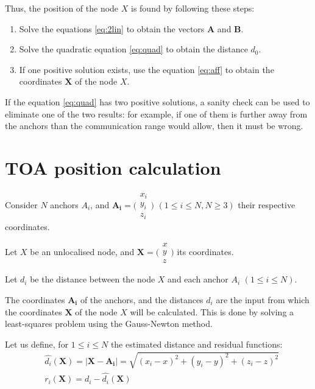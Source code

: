 \documentclass[12pt,a4paper,fleqn]{report}
\begin{document}
\begin{appendices}
{Thus, the position of the node $X$ is found by following these steps:
\begin{enumerate}
	\item Solve the equations \eqref{eq:2lin} to obtain the vectors $\mathbf{A}$ and $\mathbf{B}$.
	\item Solve the quadratic equation \eqref{eq:quad} to obtain the distance $d_0$.
	\item If one positive solution exists, use the equation \eqref{eq:aff} to obtain the coordinates $\mathbf{X}$ of the node $X$.
\end{enumerate}
If the equation \eqref{eq:quad} has two positive solutions, a sanity check can be used to eliminate one of the two results: for example, if one of them is further away from the anchors than the communication range would allow, then it must be wrong.

}

\chapter{TOA position calculation}
\label{appendix:toa}

{\parindent0pt %

Consider $N$ anchors $A_i$, and $\mathbf{A_i} = \bigl( \begin{smallmatrix} x_i \\ y_i \\ z_i \end{smallmatrix} \bigr)$ $(1 \leq i \leq N, N \geq 3)$ their respective coordinates.

Let $X$ be an unlocalised node, and $\mathbf{X} = \bigl( \begin{smallmatrix} x \\ y \\ z \end{smallmatrix} \bigr)$ its coordinates.

Let $d_i$ be the distance between the node $X$ and each anchor $A_i$ $(1 \leq i \leq N)$.

\medskip

The coordinates $\mathbf{A_i}$ of the anchors, and the distances  $d_i$ are the input from which the coordinates $\mathbf{X}$ of the node $X$ will be calculated. This is done by solving a least-squares problem using the Gauss-Newton method.

\medskip

Let us define, for $1 \leq i \leq N$ the estimated distance and residual functions:
\begin{align*}
	& \hat{d_i}(\mathbf{X})
	= |\mathbf{X} - \mathbf{A_i}|
	= \sqrt{(x_i - x)^2 + (y_i - y)^2 + (z_i - z)^2} \\
	& r_i(\mathbf{X}) = d_i - \hat{d_i}(\mathbf{X})
\end{align*}

}
\end{appendices}
\end{document}
